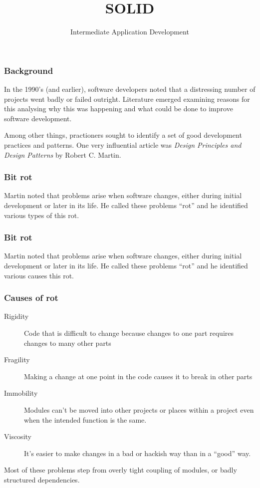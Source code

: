 \documentclass[10pt]{beamer}
\title{SOLID}
\author[IN608]{Intermediate Application Development}
\institute[Otago Polytechnic]{
  Otago Polytechnic \\
  Dunedin, New Zealand \\
  Kaiako: Tom Clark
}
\date{}
\begin{document}
\begin{frame}[plain]
  \titlepage
\end{frame}

\begin{frame}
  \frametitle{Background}
  
  In the 1990's (and earlier), software developers noted that a distressing number 
  of projects went badly or failed outright. Literature emerged examining reasons for this
  analysing why this was happening and what could be done to improve software development.
  
  Among other things, practioners sought to identify a set of good development practices and patterns.
  One very influential article was \emph{Design Principles and Design Patterns} by Robert C. Martin.
\end{frame}

\begin{frame}
  \frametitle{Bit rot}
  
  Martin noted that problems arise when software changes, either during initial
  development or later in its life. He called these problems ``rot'' and he identified
  various types of this rot.
  
  \end{frame}

\begin{frame}
  \frametitle{Bit rot}
  
  Martin noted that problems arise when software changes, either during initial
  development or later in its life. He called these problems ``rot'' and he identified
  various causes this rot.
  
  \end{frame}

\begin{frame}
  \frametitle{Causes of rot}
  
  \begin{description}
    \item[Rigidity] Code that is difficult to change because changes to
    one part requires changes to many other parts
    \item[Fragility] Making a change at one point in the code causes it to
    break in other parts
    \item[Immobility]Modules can't be moved into other projects or places within a project even
    when the intended function is the same.
    \item[Viscosity]It's easier to make changes in a bad or hackish way than in a ``good'' way. 
  \end{description}
  
  Most of these problems step from overly tight coupling of modules, or badly structured dependencies.
  
  \end{frame}
\end{document}
